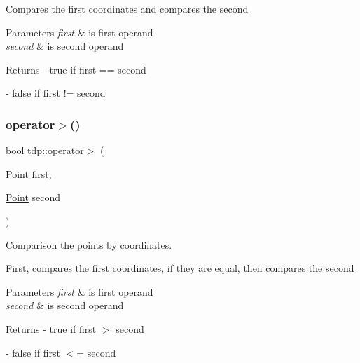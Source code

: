 Compares the first coordinates and compares the second 
\begin{DoxyParams}{Parameters}
{\em first} & is first operand \\
\hline
{\em second} & is second operand \\
\hline
\end{DoxyParams}
\begin{DoxyReturn}{Returns}
-\/ true if \textquotesingle{}first\textquotesingle{} == \textquotesingle{}second\textquotesingle{} 

-\/ false if \textquotesingle{}first\textquotesingle{} != \textquotesingle{}second\textquotesingle{} 
\end{DoxyReturn}
\mbox{\label{namespacetdp_a948b73cf0c6d99e08e145094d83d8e97}} 
\subsubsection{\texorpdfstring{operator$>$()}{operator>()}}
{\footnotesize\ttfamily bool tdp\+::operator$>$ (\begin{DoxyParamCaption}\item[{\mbox{\hyperlink{structtdp_1_1_point}{Point}}}]{first,  }\item[{\mbox{\hyperlink{structtdp_1_1_point}{Point}}}]{second }\end{DoxyParamCaption})}



Comparison the points by coordinates. 

First, compares the first coordinates, if they are equal, then compares the second 
\begin{DoxyParams}{Parameters}
{\em first} & is first operand \\
\hline
{\em second} & is second operand \\
\hline
\end{DoxyParams}
\begin{DoxyReturn}{Returns}
-\/ true if \textquotesingle{}first\textquotesingle{} $>$ \textquotesingle{}second\textquotesingle{} 

-\/ false if \textquotesingle{}first\textquotesingle{} $<$= \textquotesingle{}second\textquotesingle{} 
\end{DoxyReturn}
\mbox{\label{namespacetdp_a88169ae92b50b53e80d23d8df9d263d1}} 
